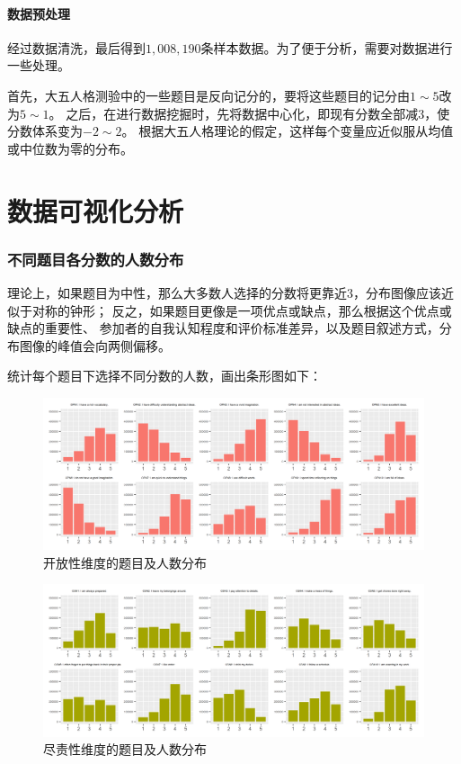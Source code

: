 \documentclass[UTF8]{ctexart}
\begin{document}
\subsection*{数据预处理}
经过数据清洗，最后得到$1,008,190$条样本数据。为了便于分析，需要对数据进行一些处理。\par
首先，大五人格测验中的一些题目是反向记分的，要将这些题目的记分由$1\sim5$改为$5\sim1$。
之后，在进行数据挖掘时，先将数据中心化，即现有分数全部减3，使分数体系变为$-2\sim2$。
根据大五人格理论的假定，这样每个变量应近似服从均值或中位数为零的分布。
\part{数据可视化分析}
\setcounter{section}{0}
\section{不同题目各分数的人数分布}
理论上，如果题目为中性，那么大多数人选择的分数将更靠近3，分布图像应该近似于对称的钟形；
反之，如果题目更像是一项优点或缺点，那么根据这个优点或缺点的重要性、
参加者的自我认知程度和评价标准差异，以及题目叙述方式，分布图像的峰值会向两侧偏移。\par
统计每个题目下选择不同分数的人数，画出条形图如下：
\begin{figure}[H]
  \centering
  \includegraphics[scale=0.478]{OPN.png}
  \caption{开放性维度的题目及人数分布}
\end{figure}
\begin{figure}[H]
  \centering
  \includegraphics[scale=0.478]{CSN.png}
  \caption{尽责性维度的题目及人数分布}
\end{figure}
\end{document}
